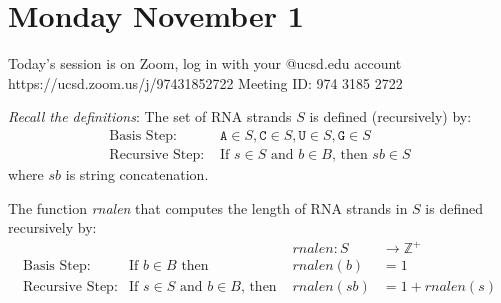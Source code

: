 \documentclass[12pt, oneside]{article}
\newcommand{\A}[0]{\texttt{A}}
\newcommand{\C}[0]{\texttt{C}}
\newcommand{\G}[0]{\texttt{G}}
\newcommand{\U}[0]{\texttt{U}}
\begin{document}
\begin{flushright}
\end{flushright} 
\section*{Monday November 1}

Today's session is on Zoom, log in with your @ucsd.edu account https://ucsd.zoom.us/j/97431852722
Meeting ID: 974 3185 2722



{\it Recall the definitions}: The set of RNA strands $S$ is defined (recursively) by:
\[
\begin{array}{ll}
\textrm{Basis Step: } & \A \in S, \C \in S, \U \in S, \G \in S \\
\textrm{Recursive Step: } & \textrm{If } s \in S\textrm{ and }b \in B \textrm{, then }sb \in S
\end{array}
\]
where $sb$ is string concatenation.

The function \textit{rnalen} that computes the length of RNA strands in $S$ is defined recursively by:
\[
\begin{array}{llll}
& & \textit{rnalen} : S & \to \mathbb{Z}^+ \\
\textrm{Basis Step:} & \textrm{If } b \in B\textrm{ then } & \textit{rnalen}(b) & = 1 \\
\textrm{Recursive Step:} & \textrm{If } s \in S\textrm{ and }b \in B\textrm{, then  } & \textit{rnalen}(sb) & = 1 + \textit{rnalen}(s)
\end{array}
\]
\end{document}
